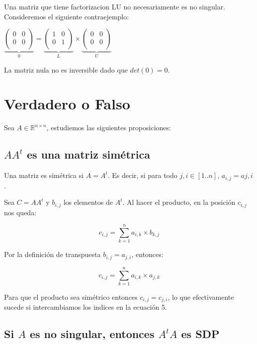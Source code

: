 \documentclass[10pt,a4paper]{article}
\begin{document}
Una matriz que tiene factorizacion LU no necesariamente es no singular. Consideremos el siguiente contraejemplo:

$\underbrace{\left(
\begin{matrix}
0 & 0 \\
0 & 0 \\
\end{matrix}\right)}_{0}
=
\underbrace{\left(
\begin{matrix}
1 & 0 \\
0 & 1 \\
\end{matrix}\right)}_{L}
\times
\underbrace{\left(
\begin{matrix}
0 & 0 \\
0 & 0 \\
\end{matrix}\right)}_{U}$

La matriz nula no es inversible dado que $det(0)=0$.

\section{Verdadero o Falso}

Sea $A \in \mathbb{R}^{n \times n}$, estudiemos las siguientes proposiciones:

\subsection{$AA^t$ es una matriz simétrica}

Una matriz es simétrica si $A = A^t$. Es decir, si para todo $j,i \in [1..n]$, $a_{i,j} = a{j,i}$.

Sea $C = AA^t$ y $b_{i,j}$ los elementos de $A^t$. Al hacer el producto, en la posición $c_{i,j}$ nos queda:

\begin{equation}
c_{i,j} = \sum_{k=1}^{n} a_{i,k} \times b_{k,j}
\end{equation}

Por la definición de transpuesta $b_{i,j} = a_{j,i}$, entonces:

\begin{equation}
c_{i,j} = \sum_{k=1}^{n} a_{i,k} \times a_{j,k}
\end{equation}

Para que el producto sea simétrico entonces $c_{i,j} = c_{j,i}$, lo que efectivamente sucede si intercambiamos los indices en la ecuación 5. 

\subsection{Si $A$ es no singular, entonces $A^tA$ es SDP}
\end{document}

